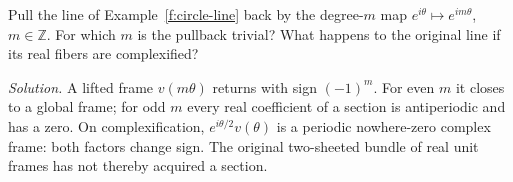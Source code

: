 \begin{exercise}
Pull the line of Example~\ref{f:circle-line} back by the degree-$m$ map $e^{i\theta}\mapsto e^{im\theta}$, $m\in\mathbb Z$. For which $m$ is the pullback trivial? What happens to the original line if its real fibers are complexified?

\emph{Solution.} A lifted frame $v(m\theta)$ returns with sign $(-1)^m$. For even $m$ it closes to a global frame; for odd $m$ every real coefficient of a section is antiperiodic and has a zero. On complexification, $e^{i\theta/2}v(\theta)$ is a periodic nowhere-zero complex frame: both factors change sign. The original two-sheeted bundle of real unit frames has not thereby acquired a section.
\end{exercise}

